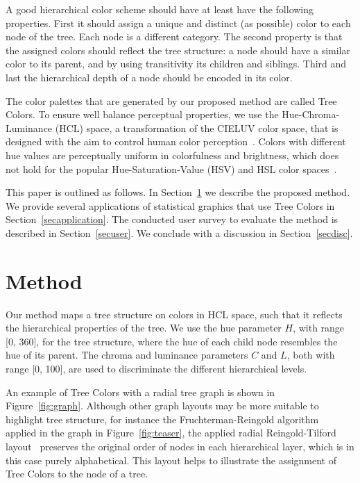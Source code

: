 \documentclass[journal]{vgtc}                %
\begin{document}
A good hierarchical color scheme should have at least have the following properties. First it should assign a unique and distinct (as possible) color to each node of the tree. Each node is a different category. The second property is that the assigned colors should reflect the tree structure: a node should have a similar color to its parent, and by using transitivity its children and siblings.
Third and last the hierarchical depth of a node should be encoded in its color. 

The color palettes that are generated by our proposed method are called Tree Colors. To ensure well
balance perceptual properties, we use the Hue-Chroma-Luminance (HCL) space, a transformation of the CIELUV color space, that is designed with the aim to control human color perception~\cite{ihaka2003}. Colors with different hue values are perceptually uniform in colorfulness and brightness, which does not hold for the popular Hue-Saturation-Value (HSV) and HSL color spaces~\cite{zeileis2009}.

This paper is outlined as follows. In Section~\ref{secmethod} we describe the proposed method. We provide several applications of statistical graphics that use Tree Colors in Section~\ref{secapplication}. The conducted user survey to evaluate the method is described in Section~\ref{secuser}. We conclude with a discussion in Section~\ref{secdisc}.

\section{Method}\label{secmethod}
Our method maps a tree structure on colors in HCL space, such that it reflects the hierarchical properties of the tree. We use the hue parameter $H$, with range [0, 360], for the tree structure, where the hue of each child node resembles the hue of its parent. The chroma and luminance parameters $C$ and $L$, both with range [0, 100], are used to discriminate the different hierarchical levels.

An example of Tree Colors with a radial tree graph is shown in Figure~\ref{fig:graph}. 
Although other graph layouts may be more suitable to highlight tree structure, for instance the Fruchterman-Reingold algorithm~\cite{Fruchterman91} applied in the graph in Figure~\ref{fig:teaser}, the applied radial Reingold-Tilford layout~\cite{reingold81} preserves the original order of nodes in each hierarchical layer, which is in this case purely alphabetical. This layout helps to illustrate the assignment of Tree Colors to the node of a tree. 
\end{document}
